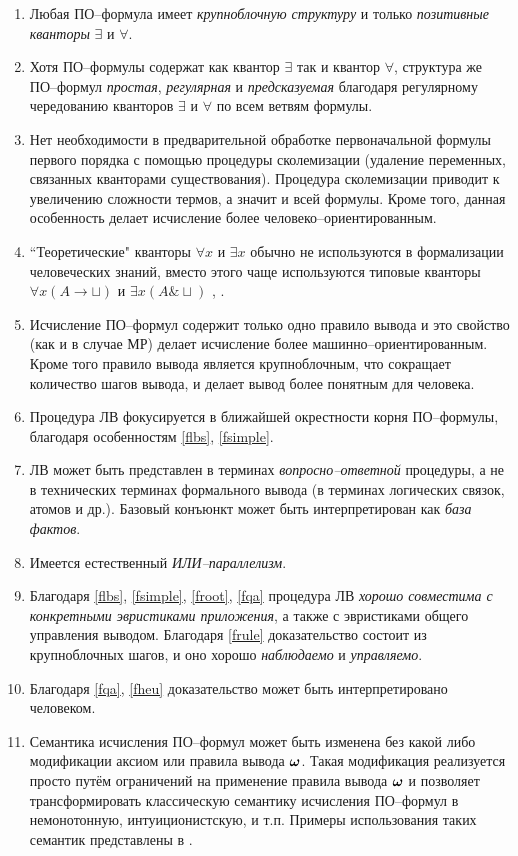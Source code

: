 \begin{enumerate}
\item\label{flbs} Любая ПО--формула имеет {\em крупноблочную структуру} и только {\em позитивные кванторы} $\exists$ и $\forall$.
%
\item\label{fsimple} Хотя ПО--формулы содержат как квантор $\exists$ так и квантор $\forall$, структура же ПО--формул {\em простая}, {\em регулярная} и {\em предсказуемая} благодаря регулярному чередованию кванторов $\exists$ и $\forall$ по всем ветвям формулы.
%
\item Нет необходимости в предварительной обработке первоначальной формулы первого порядка с помощью процедуры сколемизации (удаление переменных, связанных кванторами существования). Процедура сколемизации приводит к увеличению сложности термов, а значит и всей формулы. Кроме того, данная особенность делает исчисление более человеко--ориентированным.
%
\item ``Теоретические" кванторы $\forall x$ и $\exists x$ обычно не используются в формализации человеческих знаний, вместо этого чаще используются типовые кванторы $\forall x(A \rightarrow \sqcup)$ и $\exists x(A \& \sqcup)$ \cite{Bourbaki}, \cite{ICDS2000}.
%
\item\label{frule} Исчисление ПО--формул содержит только одно правило вывода и это свойство (как и в случае МР) делает исчисление более машинно--ориентированным. Кроме того правило вывода является крупноблочным, что сокращает количество шагов вывода, и делает вывод более понятным для человека.
%
\item\label{froot} Процедура ЛВ фокусируется в ближайшей окрестности корня ПО--формулы, благодаря особенностям \ref{flbs}, \ref{fsimple}.
%
\item\label{fqa} ЛВ может быть представлен в терминах {\em вопросно--ответной} процедуры, а не в технических терминах формального вывода (в терминах логических связок, атомов и др.). Базовый конъюнкт может быть интерпретирован как {\em база фактов}.
%
\item Имеется естественный {\em ИЛИ--параллелизм}.
%
\item\label{fheu} Благодаря \ref{flbs}, \ref{fsimple}, \ref{froot}, \ref{fqa} процедура ЛВ {\em хорошо совместима с конкретными эвристиками приложения}, а также с эвристиками общего управления выводом. Благодаря \ref{frule} доказательство состоит из крупноблочных шагов, и оно хорошо {\em наблюдаемо} и {\em управляемо}.
%
\item Благодаря \ref{fqa}, \ref{fheu} доказательство может быть интерпретировано человеком.
%
\item Семантика исчисления ПО--формул может быть изменена без какой либо модификации аксиом или правила вывода $\boldsymbol{\omega}$. Такая модификация реализуется просто путём ограничений на применение правила вывода $\boldsymbol{\omega}$ и позволяет трансформировать классическую семантику исчисления ПО--формул в немонотонную, интуиционистскую, и т.п. Примеры использования таких семантик представлены в \cite{ICDS2000}.
\end{enumerate}


